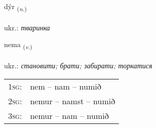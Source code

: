 \documentclass[frontgrid, backgrid]{flacards}\usepackage[]{graphicx}\usepackage[]{xcolor}
\begin{document}
\renewcommand{\flhead}{\vskip5pt \fboxsep=0pt {\small\bfseries\footnotesize Nafnorð | іменник}}
\renewcommand{\fcfoot}{\vskip5pt \fboxsep=0pt \hspace{2pt}{\small\bfseries\footnotesize 1K}}

\renewcommand{\blhead}{\vskip5pt {\small\bfseries\footnotesize Nafnorð | іменник }}
\renewcommand{\bcfoot}{\vskip5pt \hspace{2pt}{\small\bfseries\footnotesize 1K}}


{dýr \small{\textsubscript{(\textit{n.})}} \\[1ex] %
\textphonetic{[tiːr]} \\
ukr.: \emph{тваринка} \\  [2ex]
\renewcommand*{\arraystretch}{0.8}
}

\renewcommand{\flhead}{\vskip5pt \fboxsep=0pt {\small\bfseries\footnotesize Sagnorð | дієслово}}
\renewcommand{\fcfoot}{\vskip5pt \fboxsep=0pt \hspace{2pt}{\small\bfseries\footnotesize 1K}}

\renewcommand{\blhead}{\vskip5pt {\small\bfseries\footnotesize Sagnorð | дієслово }}
\renewcommand{\bcfoot}{\vskip5pt \hspace{2pt}{\small\bfseries\footnotesize 1K}}


{nema \small{\textsubscript{(\textit{v.})}} \\[1ex] %
\textphonetic{[nɛːma]} \\
ukr.: \emph{становити; брати; забирати; торкатися} \\  [2ex]
\renewcommand*{\arraystretch}{0.8}
\begin{tabular}{p{1cm}l}
\textsc{1sg}: & nem -- nam -- numið \\ 
\textsc{2sg}: & nemur -- namst -- numið \\ 
\textsc{3sg}: & nemur -- nam -- numið \\ 
\end{tabular}
}
\end{document}
